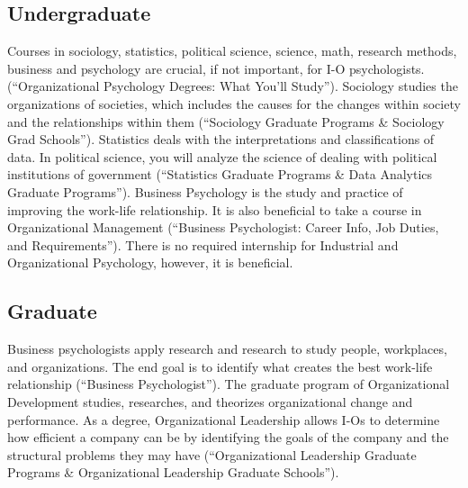 \begin{multicols}{2}
    \subsection{Undergraduate}
        Courses in sociology, statistics, political science, science, math, research methods, business and psychology are crucial, if not important, for I-O psychologists. (“Organizational Psychology Degrees: What You’ll Study”). Sociology studies the organizations of societies, which includes the causes for the changes within society and the relationships within them (“Sociology Graduate Programs \& Sociology Grad Schools”). Statistics deals with the interpretations and classifications of data. In political science, you will analyze the science of dealing with political institutions of government (“Statistics Graduate Programs \& Data Analytics Graduate Programs”). Business Psychology is the study and practice of improving the work-life relationship. It is also beneficial to take a course in Organizational Management (“Business Psychologist: Career Info, Job Duties, and Requirements”). There is no required internship for Industrial and Organizational Psychology, however, it is beneficial. 
    \subsection{Graduate}
        Business psychologists apply research and research to study people, workplaces, and organizations. The end goal is to identify what creates the best work-life relationship (“Business Psychologist”). The graduate program of Organizational Development studies, researches, and theorizes organizational change and performance. As a degree, Organizational Leadership allows I-Os to determine how efficient a company can be by identifying the goals of the company and the structural problems they may have (“Organizational Leadership Graduate Programs \& Organizational Leadership Graduate Schools”).


\end{multicols}
